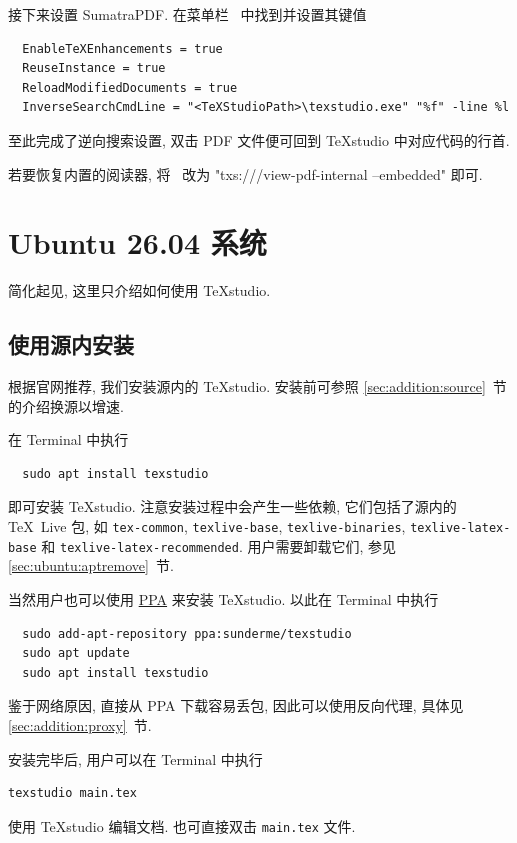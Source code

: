 接下来设置 SumatraPDF.
在菜单栏\  中找到并设置其键值
\begin{lstlisting}
  EnableTeXEnhancements = true
  ReuseInstance = true
  ReloadModifiedDocuments = true
  InverseSearchCmdLine = "<TeXStudioPath>\texstudio.exe" "%f" -line %l
\end{lstlisting}
至此完成了逆向搜索设置,
双击 PDF 文件便可回到 \TeX studio 中对应代码的行首.

若要恢复内置的阅读器,
将\  改为
"txs:///view-pdf-internal --embedded"
即可.

\section{Ubuntu 26.04 系统}\label{sec:editor:ubuntu}

简化起见, 这里只介绍如何使用 \TeX studio.

\subsection{使用源内安装}

根据官网推荐, 我们安装源内的 \TeX studio.
安装前可参照 \ref{sec:addition:source}~节的介绍换源以增速.

在 \textsf{Terminal} 中执行
\begin{lstlisting}
  sudo apt install texstudio
\end{lstlisting}
即可安装 \TeX studio.
注意安装过程中会产生一些依赖, 它们包括了源内的 \TeX~Live 包,
如 \texttt{tex-common}, \texttt{texlive-base}, \texttt{texlive-binaries}, \texttt{texlive-latex-base} 和 \texttt{texlive-latex-recommended}.
用户需要卸载它们,
参见 \ref{sec:ubuntu:aptremove}~节.

当然用户也可以使用
\href{https://code.launchpad.net/~sunderme/+archive/ubuntu/texstudio}{PPA}
来安装 \TeX studio.
以此在 \textsf{Terminal} 中执行
\begin{lstlisting}
  sudo add-apt-repository ppa:sunderme/texstudio
  sudo apt update
  sudo apt install texstudio
\end{lstlisting}
鉴于网络原因,
直接从 PPA 下载容易丢包,
因此可以使用反向代理,
具体见 \ref{sec:addition:proxy}~节.

安装完毕后,
用户可以在 \textsf{Terminal} 中执行
\begin{lstlisting}[morekeywords = texstudio, deletekeywords = tex]
  texstudio main.tex
\end{lstlisting}
使用 \TeX studio 编辑文档.
也可直接双击 \texttt{main.tex} 文件.

